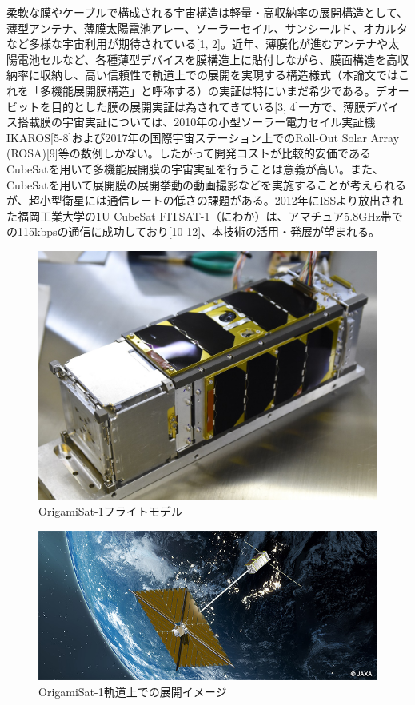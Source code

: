柔軟な膜やケーブルで構成される宇宙構造は軽量・高収納率の展開構造として、薄型アンテナ、薄膜太陽電池アレー、ソーラーセイル、サンシールド、オカルタなど多様な宇宙利用が期待されている[1, 2]。近年、薄膜化が進むアンテナや太陽電池セルなど、各種薄型デバイスを膜構造上に貼付しながら、膜面構造を高収納率に収納し、高い信頼性で軌道上での展開を実現する構造様式（本論文ではこれを「多機能展開膜構造」と呼称する）の実証は特にいまだ希少である。デオービットを目的とした膜の展開実証は為されてきている[3, 4]一方で、薄膜デバイス搭載膜の宇宙実証については、2010年の小型ソーラー電力セイル実証機IKAROS[5-8]および2017年の国際宇宙ステーション上でのRoll-Out Solar Array (ROSA)[9]等の数例しかない。したがって開発コストが比較的安価であるCubeSatを用いて多機能展開膜の宇宙実証を行うことは意義が高い。また、CubeSatを用いて展開膜の展開挙動の動画撮影などを実施することが考えられるが、超小型衛星には通信レートの低さの課題がある。2012年にISSより放出された福岡工業大学の1U CubeSat FITSAT-1（にわか）は、アマチュア5.8GHz帯での115kbpsの通信に成功しており[10-12]、本技術の活用・発展が望まれる。
\begin{figure}[H]
	\centering
	\includegraphics[width=0.7\linewidth]{01/fig/1-1-1.jpg}
	\caption{OrigamiSat-1フライトモデル}
	\label{fig1-1-1}
\end{figure}
\begin{figure}[H]
	\centering
	\includegraphics[width=1\linewidth]{01/fig/1-1-2.jpg}
	\caption{OrigamiSat-1軌道上での展開イメージ}
	\label{fig1-1-2}
\end{figure}

